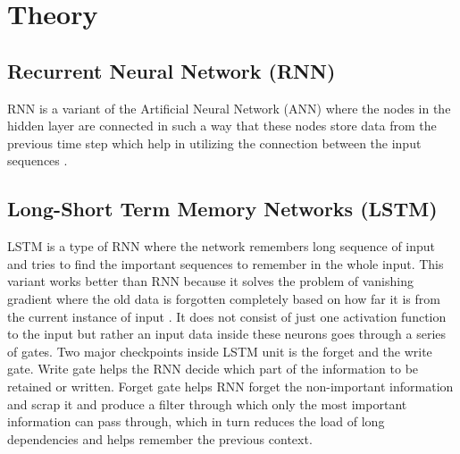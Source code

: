 \section{Theory}
\subsection{Recurrent Neural Network (RNN)} RNN is a variant of the Artificial Neural Network (ANN) where the nodes in the hidden layer are connected in such a way that these nodes store data from the previous time step which help in utilizing the connection between the input sequences \cite{DBLP:journals/corr/abs-1808-03314}.

\subsection{Long-Short Term Memory Networks (LSTM)} LSTM is a type of RNN where the network remembers long sequence of input and tries to find the important sequences to remember in the whole input. This variant works better than RNN because it solves the problem of vanishing gradient where the old data is forgotten completely based on how far it is from the current instance of input \cite{DBLP:journals/corr/abs-1808-03314}. It does not consist of just one activation function to the input but rather an input data inside these neurons goes through a series of gates. Two major checkpoints inside LSTM unit is the forget and the write gate. Write gate helps the RNN decide which part of the information to be retained or written. Forget gate helps RNN forget the non-important information and scrap it and produce a filter through which only the most important information can pass through, which in turn reduces the load of long dependencies and helps remember the previous context.

